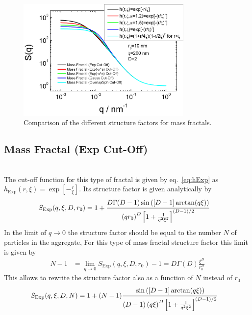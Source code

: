 \begin{figure}[htb]
\begin{center}
\includegraphics[width=0.768\textwidth]{../images/structure_factor/MassFractals/ComparingSQMassFractals.png}
\end{center}
\caption{Comparison of the different structure factors for mass
fractals.} \label{fig:MassFractCompare}
\end{figure}


\clearpage
\subsection{Mass Fractal (Exp Cut-Off)}
~\\
The cut-off function for this type of fractal is given by eq.\ \ref{eq:hExp} as
$h_\text{Exp}(r,\xi) = \exp\left[-\tfrac{r}{\xi}\right]$. Its structure factor is given analytically by
\begin{align}
S_\text{Exp}(q,\xi,D,r_0) &= 1 +  \cfrac{D \Gamma(D-1)
\sin\left([D-1]\arctan(q \xi)\right)}{\left( q r_0\right)^D
\left[1+\tfrac{1}{q^2\xi^2}\right]^{(D-1)/2}}
\end{align}
In the limit of $q \to 0$ the structure factor should be equal to the number $N$ of particles in the aggregate, For this type of mass fractal structure factor this limit is given by
\begin{align}\label{eq:fractalExp}
  N-1 & =\lim_{q\to 0}  S_\text{Exp}(q,\xi,D,r_0)-1 = D\Gamma(D) \frac{\xi^D}{r_0^D}
\end{align}
This allows to rewrite the structure factor also as a function of $N$ instead of $r_0$
\begin{align}
S_\text{Exp}(q,\xi,D,N) &= 1 +  (N-1)\cfrac{
\sin\left([D-1]\arctan(q \xi)\right)}{(D-1)\left( q \xi\right)^D
\left[1+\tfrac{1}{q^2\xi^2}\right]^{(D-1)/2}}
\end{align}

